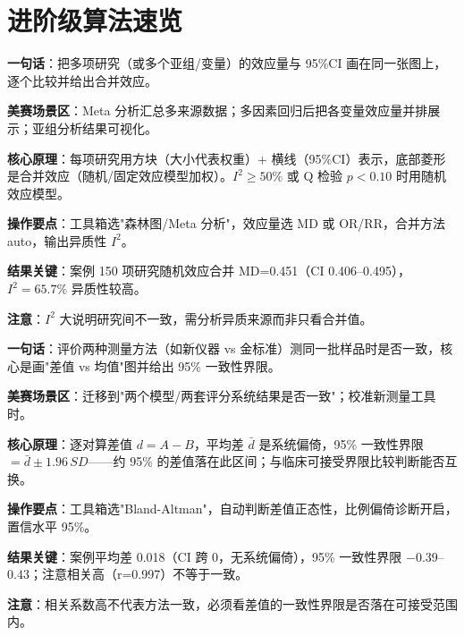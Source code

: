 \section{进阶级算法速览}


\begin{algobrief}
\textbf{一句话}：把多项研究（或多个亚组/变量）的效应量与 95\%CI 画在同一张图上，逐个比较并给出合并效应。

\textbf{美赛场景区}：Meta 分析汇总多来源数据；多因素回归后把各变量效应量并排展示；亚组分析结果可视化。

\textbf{核心原理}：每项研究用方块（大小代表权重）+ 横线（95\%CI）表示，底部菱形是合并效应（随机/固定效应模型加权）。$I^2 \geq 50\%$ 或 Q 检验 $p<0.10$ 时用随机效应模型。

\textbf{操作要点}：工具箱选"森林图/Meta 分析"，效应量选 MD 或 OR/RR，合并方法 auto，输出异质性 $I^2$。

\textbf{结果关键}：案例 150 项研究随机效应合并 MD=0.451（CI 0.406--0.495），$I^2=65.7\%$ 异质性较高。

\textbf{注意}：$I^2$ 大说明研究间不一致，需分析异质来源而非只看合并值。
\end{algobrief}


\begin{algobrief}
\textbf{一句话}：评价两种测量方法（如新仪器 vs 金标准）测同一批样品时是否一致，核心是画"差值 vs 均值"图并给出 95\% 一致性界限。

\textbf{美赛场景区}：迁移到"两个模型/两套评分系统结果是否一致"；校准新测量工具时。

\textbf{核心原理}：逐对算差值 $d=A-B$，平均差 $\bar{d}$ 是系统偏倚，95\% 一致性界限 $= \bar{d} \pm 1.96\,SD$——约 95\% 的差值落在此区间；与临床可接受界限比较判断能否互换。

\textbf{操作要点}：工具箱选"Bland-Altman"，自动判断差值正态性，比例偏倚诊断开启，置信水平 95\%。

\textbf{结果关键}：案例平均差 0.018（CI 跨 0，无系统偏倚），95\% 一致性界限 $-0.39$--$0.43$；注意相关高（r=0.997）不等于一致。

\textbf{注意}：相关系数高不代表方法一致，必须看差值的一致性界限是否落在可接受范围内。
\end{algobrief}


